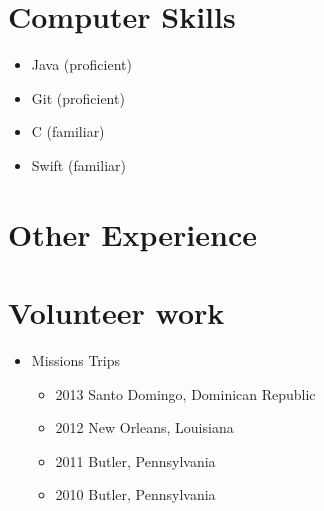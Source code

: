 \documentclass[11pt,a4paper,sans]{moderncv}        %
\begin{document}
\section{Computer Skills}
\vspace{-.5cm}
\begin{multicols}{4}
\begin{itemize}
\item{Java (proficient)}
\item{Git (proficient)}
\item{C (familiar)}
\item{Swift (familiar)}
\end{itemize}
\end{multicols}

\section{Other Experience}


\section{Volunteer work}
\begin{itemize}
\item {Missions Trips
    \begin{itemize}
    \item 2013 Santo Domingo, Dominican Republic
    \item 2012 New Orleans, Louisiana
    \item 2011 Butler, Pennsylvania
    \item 2010 Butler, Pennsylvania
    \end{itemize}}
\end{itemize}
\end{document}
